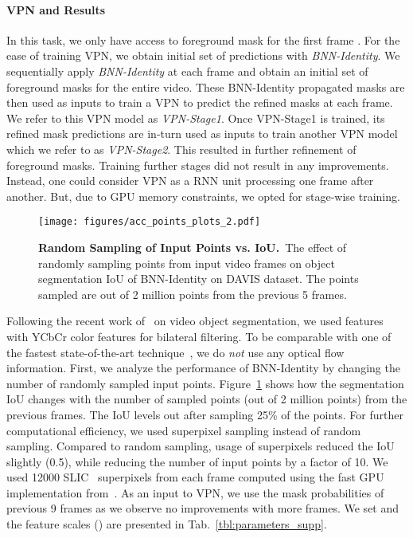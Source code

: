 \documentclass[10pt,twocolumn,letterpaper]{article}
\newcommand{\mycaption}[2]{\caption{\small \textbf{#1.}~#2}}
\begin{document}
\vspace{-0.4cm}
\paragraph{VPN and Results} In this task, we only have access to foreground mask
for the first frame .
For the ease of training VPN, we obtain initial set of predictions with
\emph{BNN-Identity}. We sequentially apply \emph{BNN-Identity} at each frame
and obtain an initial set of foreground masks for the entire video.
These BNN-Identity propagated masks are then used as inputs to train a VPN to
predict the refined masks at each frame. We refer to this
VPN model as \emph{VPN-Stage1}. Once VPN-Stage1 is trained, its refined
mask predictions are in-turn used as inputs to train another VPN model which we
refer to as \emph{VPN-Stage2}. This resulted in further refinement of foreground
masks. Training further stages did not result in any improvements. Instead, one
could consider VPN as a RNN unit processing one frame after another. But, due to
GPU memory constraints, we opted for stage-wise training.

\begin{figure}[t!]
\begin{center}
  \centerline{\texttt{[image: figures/acc\_points\_plots\_2.pdf]}}
    \mycaption{Random Sampling of Input Points vs. IoU}
    {The effect of randomly sampling points from input video frames on object
    segmentation IoU of BNN-Identity on DAVIS dataset.
    The points sampled are out of 2 million points from the previous 5 frames.}
    \label{fig:acc_vs_points}
\end{center}
\vspace{-1.2cm}
\end{figure}

Following the recent work of~\cite{marki2016bilateral} on video object segmentation,
we used  features with YCbCr color features for bilateral filtering.
To be comparable with one of the fastest state-of-the-art technique~\cite{marki2016bilateral},
we do \emph{not} use any optical flow information. First, we analyze the performance of BNN-Identity by changing the number of randomly sampled input points. Figure~\ref{fig:acc_vs_points} shows how the segmentation IoU changes with
the number of sampled points (out of 2 million points) from the previous frames.
The IoU levels out after sampling 25\% of the points. For
further computational efficiency, we used superpixel sampling instead of random
sampling. Compared to random sampling,
usage of superpixels reduced the IoU slightly (0.5), while reducing the
number of input points by a factor of 10.
We used 12000 SLIC~\cite{achanta2012slic} superpixels from each frame
computed using the fast GPU implementation from~\cite{gSLICr_2015}. As an input to VPN,
we use the mask probabilities of previous 9 frames as we observe
no improvements with more frames. We set  and the
feature scales () are presented in Tab.~\ref{tbl:parameters_supp}.
\end{document}
